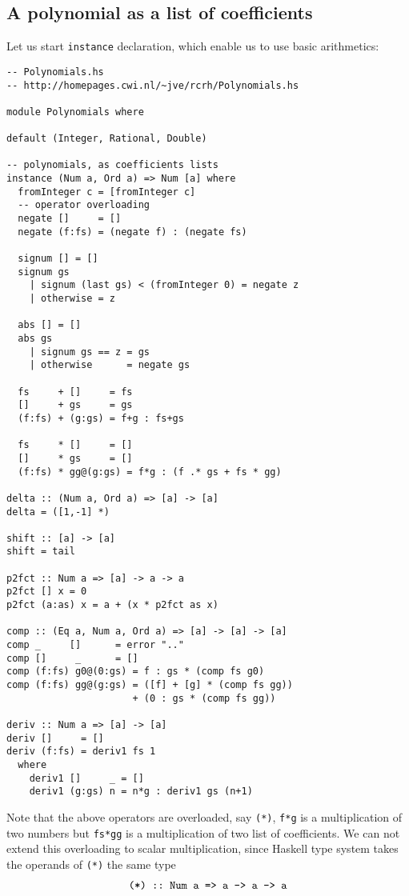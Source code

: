 \documentclass[11pt]{book}
\begin{document}
\subsection{A polynomial as a list of coefficients}
Let us start \texttt{instance} declaration, which enable us to use basic arithmetics:
\begin{verbatim}
-- Polynomials.hs
-- http://homepages.cwi.nl/~jve/rcrh/Polynomials.hs

module Polynomials where

default (Integer, Rational, Double) 

-- polynomials, as coefficients lists
instance (Num a, Ord a) => Num [a] where
  fromInteger c = [fromInteger c] 
  -- operator overloading
  negate []     = []
  negate (f:fs) = (negate f) : (negate fs)

  signum [] = []
  signum gs 
    | signum (last gs) < (fromInteger 0) = negate z
    | otherwise = z

  abs [] = []
  abs gs 
    | signum gs == z = gs
    | otherwise      = negate gs

  fs     + []     = fs
  []     + gs     = gs
  (f:fs) + (g:gs) = f+g : fs+gs

  fs     * []     = []
  []     * gs     = []
  (f:fs) * gg@(g:gs) = f*g : (f .* gs + fs * gg)

delta :: (Num a, Ord a) => [a] -> [a]
delta = ([1,-1] *)

shift :: [a] -> [a]
shift = tail 

p2fct :: Num a => [a] -> a -> a
p2fct [] x = 0
p2fct (a:as) x = a + (x * p2fct as x)

comp :: (Eq a, Num a, Ord a) => [a] -> [a] -> [a]
comp _     []      = error ".."
comp []     _      = []
comp (f:fs) g0@(0:gs) = f : gs * (comp fs g0)
comp (f:fs) gg@(g:gs) = ([f] + [g] * (comp fs gg))
                      + (0 : gs * (comp fs gg))

deriv :: Num a => [a] -> [a]
deriv []     = []
deriv (f:fs) = deriv1 fs 1 
  where 
    deriv1 []     _ = []
    deriv1 (g:gs) n = n*g : deriv1 gs (n+1)

\end{verbatim}
Note that the above operators are overloaded, say \texttt{(*)}, \texttt{f*g} is a multiplication of two numbers but \texttt{fs*gg} is a multiplication of two list of coefficients.
We can not extend this overloading to scalar multiplication, since Haskell type system takes the operands of \texttt{(*)} the same type
\begin{eqnarray}
\verb+(*) :: Num a => a -> a -> a+
\end{eqnarray}
\end{document}
